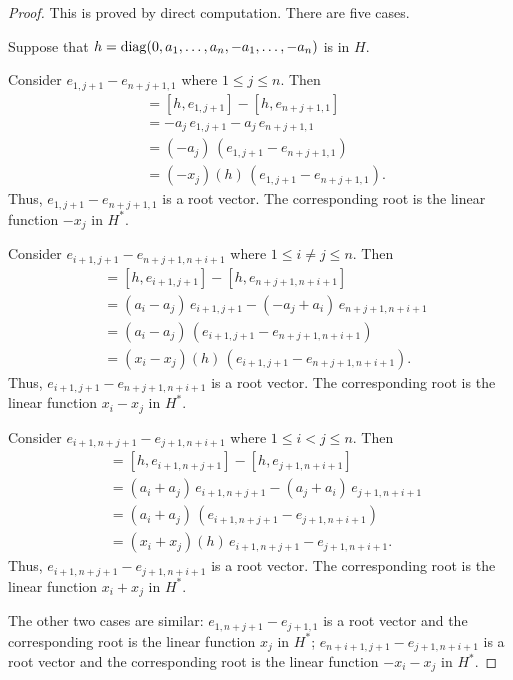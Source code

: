 \begin{proof}
  This is proved by direct computation. There are five cases.

  Suppose that $h={\operatorname{diag}(0,a_1,\dots,a_n, -a_1,\dots,-a_n)}$ is in $H$.

  Consider $e_{1, j+1}-e_{n+j+1,1}$ where $1\leq j\leq n$. Then
  \begin{align*}
    [h, e_{1, j+1}-e_{n+j+1,1}]& =[h,e_{1,j+1}] -[h,e_{n+j+1, 1}]\\
    &= -a_j\, e_{1,j+1} -a_{j} \, e_{n+j+1, 1} \\
    &= (-a_j)\, (e_{1, j+1}-e_{n+j+1,1}) \\
    &= (-x_j)(h) \, (e_{1, j+1}-e_{n+j+1,1}).
  \end{align*}
  Thus, $e_{1, j+1}-e_{n+j+1,1}$ is a root vector. The corresponding root is
  the linear function $-x_j$ in $H^*$.

  Consider $e_{i+1,j+1} -e_{n+j+1, n+i+1}$ where $1\leq i\ne j\leq n$. Then
  \begin{align*}
    [h, e_{i+1,j+1} -e_{n+j+1, n+i+1}]& =[h,e_{i+1,j+1}] -[h,e_{n+j+1,
      n+i+1}]\\
    &= (a_i-a_j)\, e_{i+1,j+1} - (-a_{j} + a_{i}) \, e_{n+j+1, n+i+1} \\
    &= (a_i-a_j)\, (e_{i+1,j+1} -e_{n+j+1, n+i+1}) \\
    &= (x_i-x_j)(h) \, (e_{i+1,j+1} -e_{n+j+1, n+i+1}).
  \end{align*}
  Thus, $e_{i+1,j+1} -e_{n+j+1, n+i+1}$ is a root vector. The corresponding
  root is the linear function $x_i-x_j$ in $H^*$.

  Consider $e_{i+1,n+j+1} -e_{j+1, n+i+1}$ where $1\leq i<j\leq n$. Then
  \begin{align*}
    [h, e_{i+1,n+j+1} -e_{j+1, n+i+1}]& =[h,e_{i+1,n+j+1} ] -[h,e_{j+1,
      n+i+1}]\\
    &= (a_i+a_j)\, e_{i+1,n+j+1} - (a_{j} + a_{i}) \, e_{j+1, n+i+1} \\
    &= (a_i+a_j)\, (e_{i+1,n+j+1} -e_{j+1, n+i+1}) \\
    &= (x_i+x_j)(h) \,e_{i+1,n+j+1} -e_{j+1, n+i+1}.
  \end{align*}
  Thus, $e_{i+1,n+j+1} -e_{j+1, n+i+1}$ is a root vector. The corresponding
  root is the linear function $x_i+x_j$ in $H^*$.

  The other two cases are similar: $e_{1,n+j+1} -e_{j+1, 1}$ is a root
  vector and the corresponding root is the linear function $x_j$ in $H^*$;
  $e_{n+i+1,j+1} -e_{j+1, n+i+1}$ is a root vector and the corresponding
  root is the linear function $-x_i-x_j$ in $H^*$.


\end{proof}
